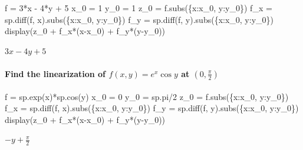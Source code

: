\documentclass[
  letterpaper,
  DIV=11,
  numbers=noendperiod]{scrartcl}
\let\oldparagraph\paragraph
\renewcommand{\paragraph}[1]{\oldparagraph{#1}\mbox{}}
\newenvironment{Shaded}{\begin{snugshade}}{\end{snugshade}}
\newcommand{\DecValTok}[1]{\textcolor[rgb]{0.68,0.00,0.00}{#1}}
\newcommand{\NormalTok}[1]{\textcolor[rgb]{0.00,0.23,0.31}{#1}}
\newcommand{\OperatorTok}[1]{\textcolor[rgb]{0.37,0.37,0.37}{#1}}
\begin{document}
\begin{Shaded}
\begin{Highlighting}[numbers=left,,]
\NormalTok{f }\OperatorTok{=} \DecValTok{3}\OperatorTok{*}\NormalTok{x }\OperatorTok{{-}} \DecValTok{4}\OperatorTok{*}\NormalTok{y }\OperatorTok{+} \DecValTok{5}
\NormalTok{x\_0 }\OperatorTok{=} \DecValTok{1}
\NormalTok{y\_0 }\OperatorTok{=} \DecValTok{1}
\NormalTok{z\_0 }\OperatorTok{=}\NormalTok{ f.subs(\{x:x\_0, y:y\_0\})}
\NormalTok{f\_x }\OperatorTok{=}\NormalTok{ sp.diff(f, x).subs(\{x:x\_0, y:y\_0\})}
\NormalTok{f\_y }\OperatorTok{=}\NormalTok{ sp.diff(f, y).subs(\{x:x\_0, y:y\_0\})}
\NormalTok{display(z\_0 }\OperatorTok{+}\NormalTok{ f\_x}\OperatorTok{*}\NormalTok{(x}\OperatorTok{{-}}\NormalTok{x\_0) }\OperatorTok{+}\NormalTok{ f\_y}\OperatorTok{*}\NormalTok{(y}\OperatorTok{{-}}\NormalTok{y\_0))}
\end{Highlighting}
\end{Shaded}

$\displaystyle 3 x - 4 y + 5$

\hypertarget{find-the-linearization-of-fx-y-ex-cos-y-at-0-fracpi2}{%
\paragraph{\texorpdfstring{Find the linearization of
\(f(x, y) = e^x \cos y\) at
\((0, \frac{\pi}{2})\)}{Find the linearization of f(x, y) = e\^{}x \textbackslash cos y at (0, \textbackslash frac\{\textbackslash pi\}\{2\})}}\label{find-the-linearization-of-fx-y-ex-cos-y-at-0-fracpi2}}

\begin{Shaded}
\begin{Highlighting}[numbers=left,,]
\NormalTok{f }\OperatorTok{=}\NormalTok{ sp.exp(x)}\OperatorTok{*}\NormalTok{sp.cos(y)}
\NormalTok{x\_0 }\OperatorTok{=} \DecValTok{0}
\NormalTok{y\_0 }\OperatorTok{=}\NormalTok{ sp.pi}\OperatorTok{/}\DecValTok{2}
\NormalTok{z\_0 }\OperatorTok{=}\NormalTok{ f.subs(\{x:x\_0, y:y\_0\})}
\NormalTok{f\_x }\OperatorTok{=}\NormalTok{ sp.diff(f, x).subs(\{x:x\_0, y:y\_0\})}
\NormalTok{f\_y }\OperatorTok{=}\NormalTok{ sp.diff(f, y).subs(\{x:x\_0, y:y\_0\})}
\NormalTok{display(z\_0 }\OperatorTok{+}\NormalTok{ f\_x}\OperatorTok{*}\NormalTok{(x}\OperatorTok{{-}}\NormalTok{x\_0) }\OperatorTok{+}\NormalTok{ f\_y}\OperatorTok{*}\NormalTok{(y}\OperatorTok{{-}}\NormalTok{y\_0))}
\end{Highlighting}
\end{Shaded}

$\displaystyle - y + \frac{\pi}{2}$
\end{document}
